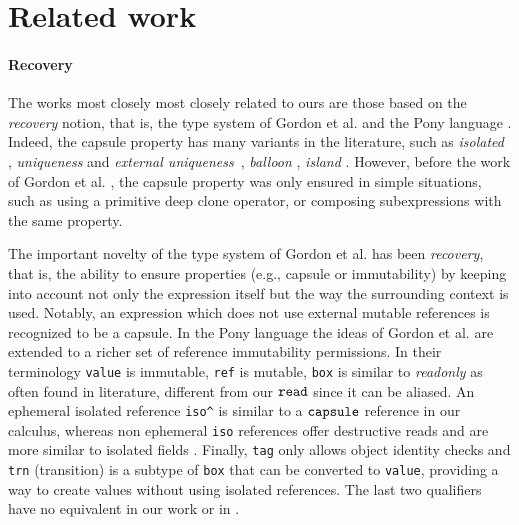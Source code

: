 \section{Related work}\label{sect:related}

\paragraph{{Recovery}} {The works most closely most closely related to ours are those based on the \emph{recovery} notion, that is, the type system of Gordon et al. \cite{GordonEtAl12} and the Pony language  \cite{ClebschEtAl15}.} Indeed, the capsule property has many variants in the literature, such as \emph{isolated} \cite{GordonEtAl12}, \emph{uniqueness} \cite{Boyland10} and \emph{external uniqueness}~\cite{ClarkeWrigstad03}, \emph{balloon} \cite{Almeida97,ServettoEtAl13a}, \emph{island} \cite{DietlEtAl07}. 
However, before the work of Gordon et al. \cite{GordonEtAl12}, the capsule property was only ensured in simple situations, such as using a primitive deep clone operator, or composing subexpressions with the same property.

The important novelty of the type system of Gordon et al. \cite{GordonEtAl12} has been \emph{recovery}, that is, the ability to ensure properties (e.g., capsule or immutability) by keeping into account not only the expression itself but the way the surrounding context is used. {Notably,} an expression which does not use external mutable references is recognized to be a capsule. 
{In the Pony language \cite{ClebschEtAl15}  the ideas of Gordon et al. \cite{GordonEtAl12} are extended to a richer set of reference immutability permissions. In their terminology \texttt{value} is immutable, \texttt{ref} is mutable, \texttt{box} is similar to \emph{readonly} as often found in literature, different from our $\texttt{read}$ since it can be aliased. An ephemeral isolated reference \lstinline{iso^} is similar to a $\texttt{capsule}$ reference in our calculus, whereas non ephemeral \texttt{iso} references offer destructive reads and are more
similar to isolated fields \cite{GordonEtAl12}. Finally, \texttt{tag} only allows object identity checks and \texttt{trn} (transition) is a subtype of \texttt{box} that can be converted to \texttt{value}, providing a way to create values without using isolated references. The last two qualifiers have no equivalent in our
work or in  \cite{GordonEtAl12}.}

